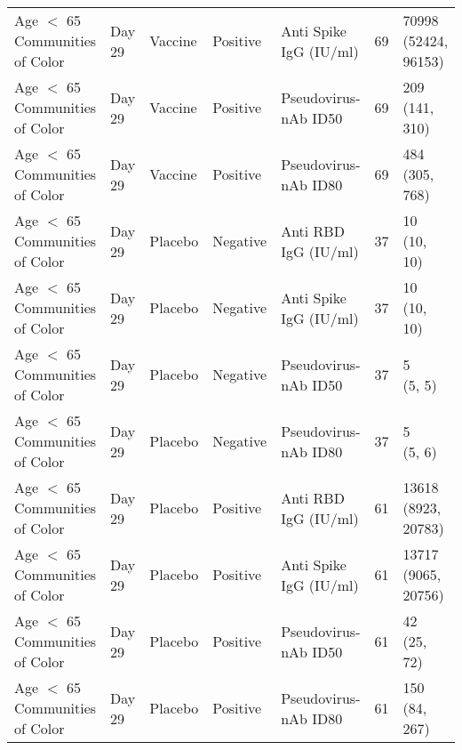 \documentclass[]{book}
\theoremstyle{definition}
\theoremstyle{definition}
\theoremstyle{definition}
\newcommand{\1}{\mathbbm{1}}
\begin{document}
\begin{landscape}
\begin{ThreePartTable}
\begin{longtable}[t]{>{\raggedright\arraybackslash}p{7cm}llllll}
\hspace{1em}Age $<$ 65 Communities of Color & Day 29 & Vaccine & Positive & Anti Spike IgG (IU/ml) & 69 & \makecell[l]{70998\\(52424, 96153)}\\
\hspace{1em}Age $<$ 65 Communities of Color & Day 29 & Vaccine & Positive & Pseudovirus-nAb ID50 & 69 & \makecell[l]{209\\(141, 310)}\\
\hspace{1em}Age $<$ 65 Communities of Color & Day 29 & Vaccine & Positive & Pseudovirus-nAb ID80 & 69 & \makecell[l]{484\\(305, 768)}\\
\hspace{1em}Age $<$ 65 Communities of Color & Day 29 & Placebo & Negative & Anti RBD IgG (IU/ml) & 37 & \makecell[l]{10\\(10, 10)}\\
\hspace{1em}Age $<$ 65 Communities of Color & Day 29 & Placebo & Negative & Anti Spike IgG (IU/ml) & 37 & \makecell[l]{10\\(10, 10)}\\
\hspace{1em}Age $<$ 65 Communities of Color & Day 29 & Placebo & Negative & Pseudovirus-nAb ID50 & 37 & \makecell[l]{5\\(5, 5)}\\
\hspace{1em}Age $<$ 65 Communities of Color & Day 29 & Placebo & Negative & Pseudovirus-nAb ID80 & 37 & \makecell[l]{5\\(5, 6)}\\
\hspace{1em}Age $<$ 65 Communities of Color & Day 29 & Placebo & Positive & Anti RBD IgG (IU/ml) & 61 & \makecell[l]{13618\\(8923, 20783)}\\
\hspace{1em}Age $<$ 65 Communities of Color & Day 29 & Placebo & Positive & Anti Spike IgG (IU/ml) & 61 & \makecell[l]{13717\\(9065, 20756)}\\
\hspace{1em}Age $<$ 65 Communities of Color & Day 29 & Placebo & Positive & Pseudovirus-nAb ID50 & 61 & \makecell[l]{42\\(25, 72)}\\
\hspace{1em}Age $<$ 65 Communities of Color & Day 29 & Placebo & Positive & Pseudovirus-nAb ID80 & 61 & \makecell[l]{150\\(84, 267)}\\

\end{longtable}
\end{ThreePartTable}
\end{landscape}
\end{document}
